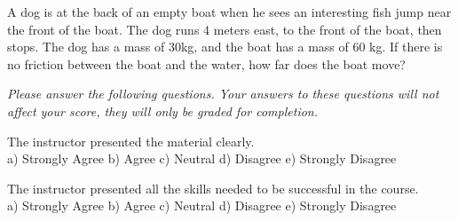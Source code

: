 \documentclass[10pt]{examdesign}
\begin{document}
\begin{multiplechoice} [title={Multiple Choice (5 Points Each)},
	rearrange=yes]
\begin{block}
\end{block}






\begin{question}
	A dog is at the back of an empty boat when he sees an interesting fish jump near the front of the boat.  The dog runs 4 meters east, to the front of the boat, then stops.  The dog has a mass of 30kg, and the boat has a mass of 60 kg.  If there is no friction between the boat and the water, how far does the boat move? 
\end{question}

\end{multiplechoice}




\begin{multiplechoice} [title={Survey Questions (1 Point Each)},
	rearrange=no]
	\textit{Please answer the following questions.  Your answers to these questions will not affect your score, they will only be graded for completion.  } 

\begin{question}
	 The instructor presented the material clearly.
\\a) Strongly Agree	b) Agree	c) Neutral	d) Disagree	e) Strongly Disagree
\end{question}

\begin{question}
 The instructor presented all the skills needed to be successful in the course.
\\a) Strongly Agree	b) Agree	c) Neutral	d) Disagree	e) Strongly Disagree
\end{question}


\end{multiplechoice}
\end{document}
